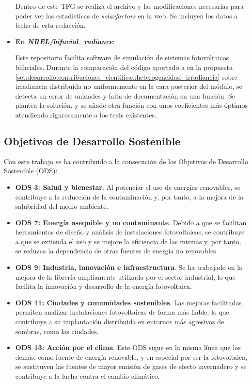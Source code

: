 \begin{itemize}
          Dentro de este TFG se realiza el archivo y las modificaciones necesarias para poder ver las estadísticas de \textit{solarfactors} en la web. Se incluyen los datos a fecha de esta redacción.

    \item \textbf{En \textit{NREL/bifacial\_radiance}}:
    
          Este \gls{repositorio} facilita \gls{software} de simulación de sistemas fotovoltaicos bifaciales. Durante la comparación del código aportado a \pvlibpy{} en la propuesta \ref{sct:desarrollo:contribuciones_cientificas:heterogeneidad_irradiancia} sobre irradiancia distribuida no uniformemente en la cara posterior del \gls{módulo}, se detecta un error de unidades y falta de documentación en una función. Se plantea la solución, y se añade otra función con unos coeficientes más óptimos atendiendo rigurosamente a los tests existentes.

\end{itemize}


\subsection{Objetivos de Desarrollo Sostenible} \label{sssct:impacto:ods}

Con este trabajo se ha contribuido a la consecución de los Objetivos de Desarrollo Sostenible (ODS):

\begin{itemize}
    \item \textbf{ODS 3: Salud y bienestar}. Al potenciar el uso de energías renovables, se contribuye a la reducción de la contaminación y, por tanto, a la mejora de la salubridad del medio ambiente.
    \item \textbf{ODS 7: Energía asequible y no contaminante}. Debido a que se facilitan herramientas de diseño y análisis de instalaciones fotovoltaicas, se contribuye a que se extienda el uso y se mejore la eficiencia de las mismas y, por tanto, se reduzca la dependencia de otras fuentes de energía no renovables.
    \item \textbf{ODS 9: Industria, innovación e infraestructura}. Se ha trabajado en la mejora de la librería \pvlibpy ampliamente utilizada por el sector industrial, lo que facilita la innovación y desarrollo de la energía fotovoltaica.
    \item \textbf{ODS 11: Ciudades y comunidades sostenibles}. Las mejoras facilitadas permiten analizar instalaciones fotovoltaicas de forma más fiable, lo que contribuye a su implantación distribuida en entornos más agresivos de sombras, como las ciudades.
    \item \textbf{ODS 13: Acción por el clima}. Este ODS sigue en la misma línea que los demás: como fuente de energía renovable, y en especial por ser la fotovoltaica, se sustituyen las fuentes de mayor emisión de gases de efecto invernadero y se contribuye a la lucha contra el cambio climático.
\end{itemize}


